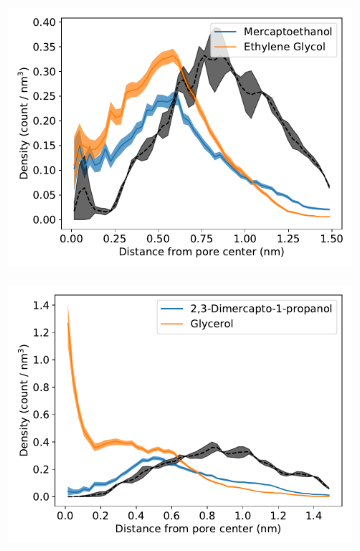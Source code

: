 \documentclass{article}
\begin{document}
  \begin{figure}
  \centering
  \begin{subfigure}{0.325\linewidth}
  \includegraphics[width=\textwidth]{thiol_comparison_SOH.pdf}
  \caption{}\label{fig:SOH_GCL_comparison}
  \end{subfigure}
  \begin{subfigure}{0.325\linewidth}
  \includegraphics[width=\textwidth]{thiol_comparison_DMP.pdf}
  \caption{}\label{fig:DMP_GLY_comparison}
  \end{subfigure}
  \begin{subfigure}{0.325\linewidth}

\end{subfigure}
\end{figure}
\end{document}

